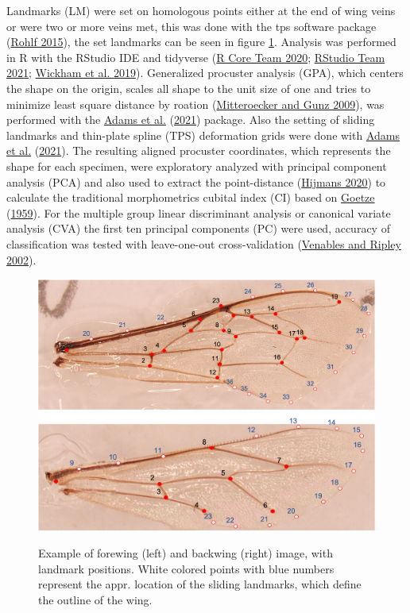 \documentclass[
]{article}
\begin{document}
Landmarks (LM) were set on homologous points either at the end of wing veins or were two or more veins met, this was done with the tps software package (\protect\hyperlink{ref-rohlf2015}{Rohlf 2015}), the set landmarks can be seen in figure \ref{fig:landmarkImage}. Analysis was performed in R with the RStudio IDE and tidyverse (\protect\hyperlink{ref-r2020}{R Core Team 2020}; \protect\hyperlink{ref-RStudio2021}{RStudio Team 2021}; \protect\hyperlink{ref-tidyverse2019}{Wickham et al. 2019}). Generalized procuster analysis (GPA), which centers the shape on the origin, scales all shape to the unit size of one and tries to minimize least square distance by roation (\protect\hyperlink{ref-mitteroecker2009}{Mitteroecker and Gunz 2009}), was performed with the \protect\hyperlink{ref-geomorph2021a}{Adams et al.} (\protect\hyperlink{ref-geomorph2021a}{2021}) package. Also the setting of sliding landmarks and thin-plate spline (TPS) deformation grids were done with \protect\hyperlink{ref-geomorph2021a}{Adams et al.} (\protect\hyperlink{ref-geomorph2021a}{2021}). The resulting aligned procuster coordinates, which represents the shape for each specimen, were exploratory analyzed with principal component analysis (PCA) and also used to extract the point-distance (\protect\hyperlink{ref-raster2020}{Hijmans 2020}) to calculate the traditional morphometrics cubital index (CI) based on \protect\hyperlink{ref-goetze1959}{Goetze} (\protect\hyperlink{ref-goetze1959}{1959}). For the multiple group linear discriminant analysis or canonical variate analysis (CVA) the first ten principal components (PC) were used, accuracy of classification was tested with leave-one-out cross-validation (\protect\hyperlink{ref-MASS2002}{Venables and Ripley 2002}).



\begin{figure}[H]

{\centering \includegraphics[width=0.4\linewidth,]{images/forewing} \includegraphics[width=0.4\linewidth,]{images/backwing} 

}

\caption{Example of forewing (left) and backwing (right) image, with landmark positions. White colored points with blue numbers represent the appr. location of the sliding landmarks, which define the outline of the wing.}\label{fig:landmarkImage}
\end{figure}
\end{document}
